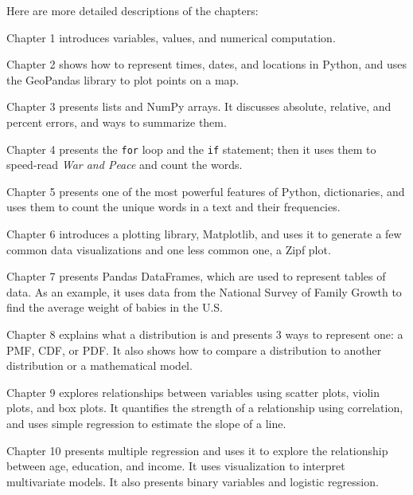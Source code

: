 Here are more detailed descriptions of the chapters:

\begin{description}

\item Chapter 1 introduces variables, values, and numerical computation.

\item Chapter 2 shows how to represent times, dates, and locations in Python, and uses the GeoPandas library to plot points on a map.

\item Chapter 3 presents lists and NumPy arrays. It discusses absolute, relative, and percent errors, and ways to summarize them.

\item Chapter 4 presents the \texttt{for} loop and the \texttt{if} statement; then it uses them to speed-read \emph{War and Peace} and count the words.

\item Chapter 5 presents one of the most powerful features of Python, dictionaries, and uses them to count the unique words in a text and their frequencies.

\item Chapter 6 introduces a plotting library, Matplotlib, and uses it to generate a few common data visualizations and one less common one, a Zipf plot.

\item Chapter 7 presents Pandas DataFrames, which are used to represent tables of data. As an example, it uses data from the National Survey of Family Growth to find the average weight of babies in the U.S.

\item Chapter 8 explains what a distribution is and presents 3 ways to represent one: a PMF, CDF, or PDF. It also shows how to compare a distribution to another distribution or a mathematical model.

\item Chapter 9 explores relationships between variables using scatter plots, violin plots, and box plots. It quantifies the strength of a relationship using correlation, and uses simple regression to estimate the slope of a line.

\item Chapter 10 presents multiple regression and uses it to explore the relationship between age, education, and income. It uses visualization to interpret multivariate models. It also presents binary variables and logistic regression.


\end{description}
